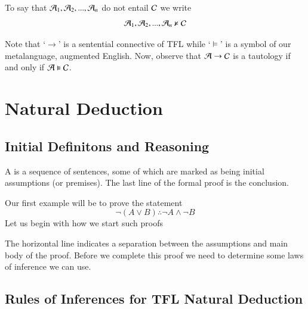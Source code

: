\documentclass[12pt, a4paper, oneside, openright, titlepage]{book}
\begin{document}
\begin{defn}
    To say that $\mathcal{A}_1,\mathcal{A}_2,...,\mathcal{A}_n$ do not entail $\mathcal{C}$ we write \begin{equation}
        \mathcal{A}_1,\mathcal{A}_2,...,\mathcal{A}_n \nvDash \mathcal{C}
    \end{equation}
\end{defn}


\begin{rmk}
    Note that `$\rightarrow$' is a sentential connective of TFL while `$\vDash$' is a symbol of our metalanguage, augmented English. Now, observe that $\mathcal{A} \rightarrow \mathcal{C}$ is a tautology if and only if $\mathcal{A} \vDash \mathcal{C}$.
\end{rmk}





\chapter{\textsection\textsection Natural Deduction}

\section{\textsection Initial Definitons and Reasoning}

\begin{defn}
    A  is a sequence of sentences, some of which are marked as being initial assumptions (or premises). The last line of the formal proof is the conclusion.
\end{defn}

\begin{eg}
    Our first example will be to prove the statement \begin{equation*}
        \lnot(A\lor B)\therefore \lnot A \wedge \lnot B
    \end{equation*}
    Let us begin with how we start such proofs\begin{fitchproof}
	\end{fitchproof}
    The horizontal line indicates a separation between the assumptions and main body of the proof. Before we complete this proof we need to determine some laws of inference we can use.
\end{eg}

\section{\textsection Rules of Inferences for TFL Natural Deduction}
\end{document}
